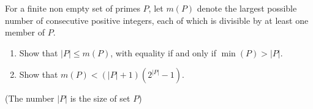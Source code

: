 For a finite non empty set of primes $P$, let $m(P)$ denote the largest possible number of consecutive positive integers, each of which is divisible by at least one member of $P$.
\begin{enumerate}[label=(\roman*)]
	\item Show that $|P|\le m(P)$, with equality if and only if $\min(P)>|P|$.
	\item Show that $m(P)<(|P|+1)(2^{|P|}-1)$.
\end{enumerate}
(The number $|P|$ is the size of set $P$)